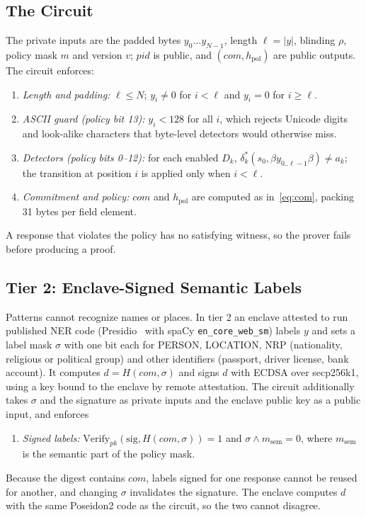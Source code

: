 \documentclass[conference]{IEEEtran}
\begin{document}
\subsection{The Circuit}

The private inputs are the padded bytes $y_0\dots y_{N-1}$, length $\ell=|y|$, blinding $\rho$, policy mask $m$ and version $v$; $\mathit{pid}$ is public, and $(\mathit{com}, h_{\mathrm{pol}})$ are public outputs. The circuit enforces:
\begin{enumerate}[leftmargin=1.4em,label=\textbf{P\arabic*},itemsep=1pt]
  \item \emph{Length and padding:} $\ell \le N$; $y_i \ne 0$ for $i < \ell$ and $y_i = 0$ for $i \ge \ell$.
  \item \emph{ASCII guard (policy bit 13):} $y_i < 128$ for all $i$, which rejects Unicode digits and look-alike characters that byte-level detectors would otherwise miss.
  \item \emph{Detectors (policy bits 0--12):} for each enabled $D_k$, $\delta_k^\ast(s_0,\beta y_{0..\ell-1}\beta) \ne a_k$; the transition at position $i$ is applied only when $i < \ell$.
  \item \emph{Commitment and policy:} $\mathit{com}$ and $h_{\mathrm{pol}}$ are computed as in~\eqref{eq:com}, packing 31 bytes per field element.
\end{enumerate}
A response that violates the policy has no satisfying witness, so the prover fails before producing a proof.

\subsection{Tier 2: Enclave-Signed Semantic Labels}

Patterns cannot recognize names or places. In tier 2 an enclave attested to run published NER code (Presidio~\cite{presidio} with spaCy \texttt{en\_core\_web\_sm}) labels $y$ and sets a label mask $\sigma$ with one bit each for PERSON, LOCATION, NRP (nationality, religious or political group) and other identifiers (passport, driver license, bank account). It computes $d = H(\mathit{com}, \sigma)$ and signs $d$ with ECDSA over secp256k1, using a key bound to the enclave by remote attestation. The circuit additionally takes $\sigma$ and the signature as private inputs and the enclave public key as a public input, and enforces
\begin{enumerate}[leftmargin=1.4em,label=\textbf{P\arabic*},itemsep=1pt,start=5]
  \item \emph{Signed labels:} $\mathrm{Verify}_{pk}(\mathrm{sig}, H(\mathit{com},\sigma)) = 1$ and $\sigma \wedge m_{\mathrm{sem}} = 0$, where $m_{\mathrm{sem}}$ is the semantic part of the policy mask.
\end{enumerate}
Because the digest contains $\mathit{com}$, labels signed for one response cannot be reused for another, and changing $\sigma$ invalidates the signature. The enclave computes $d$ with the same Poseidon2 code as the circuit, so the two cannot disagree.
\end{document}

